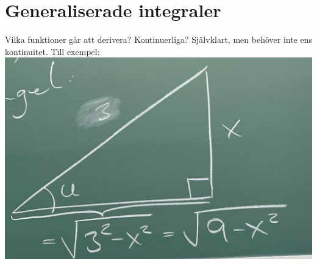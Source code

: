\chapter{Generaliserade integraler}
Vilka funktioner går att derivera?
Kontinuerliga?
Självklart, men behöver inte ens kontinuitet.
Till exempel:\\
\includegraphics[scale=0.1]{lessons/lesson18/imgs/img01.jpg}\\

